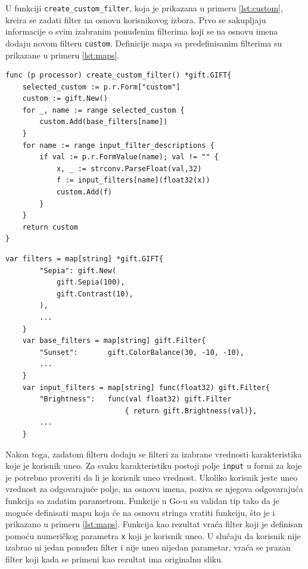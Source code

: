 \documentclass[12pt,oneside]{memoir}
\begin{document}
U funkciji  \texttt{create\_custom\_filter}, koja je prikazana u primeru \ref{lst:custom}, kreira se zadati filter na osnovu korisnikovog izbora. Prvo se sakupljaju informacije o svim izabranim ponuđenim filterima koji se na osnovu imena dodaju novom filteru  \texttt{custom}. Definicije mapa sa predefinisanim filterima su prikazane u primeru \ref{lst:maps}. 

\begin{center}
\begin{lstlisting}[caption=Funkcija za kreiranje zadatog filtera,label={lst:custom}, backgroundcolor=\color{background}]
func (p processor) create_custom_filter() *gift.GIFT{
	selected_custom := p.r.Form["custom"]
	custom := gift.New()
	for _, name := range selected_custom {
		custom.Add(base_filters[name])
	}
	for name := range input_filter_descriptions {
		if val := p.r.FormValue(name); val != "" {
			x, _ := strconv.ParseFloat(val,32)
			f := input_filters[name](float32(x))
			custom.Add(f)
		}
	}
	return custom
}
\end{lstlisting}
\end{center}

\begin{center}
\begin{lstlisting}[caption=Mape koje se koriste za definisanje različitih vrsta filtera,label={lst:maps},  backgroundcolor=\color{background}]
	var filters = map[string] *gift.GIFT{
		"Sepia": gift.New(
			gift.Sepia(100),
			gift.Contrast(10),
		),
		...
	}
	var base_filters = map[string] gift.Filter{
		"Sunset":      	gift.ColorBalance(30, -10, -10),
		...
	}
	var input_filters = map[string] func(float32) gift.Filter{
		"Brightness":	func(val float32) gift.Filter 
							{ return gift.Brightness(val)},
		...
	}
\end{lstlisting}
\end{center}

Nakon toga, zadatom filteru dodaju se filteri za izabrane vrednosti karakteristika koje je korisnik uneo. Za svaku karakteristiku postoji polje \texttt{input} u formi za koje je potrebno proveriti da li je korisnik uneo vrednost. Ukoliko korisnik jeste uneo vrednost za odgovarajuće polje, na osnovu imena, poziva se njegova odgovarajuća funkcija sa zadatim parametrom. Funkcije u Go-u su validan tip tako da je moguće definisati mapu koja će na osnovu stringa vratiti funkciju, što je i prikazano u primeru \ref{lst:maps}. Funkcija kao rezultat vraća filter koji je definisan pomoću numeričkog parametra  \texttt{x} koji je korisnik uneo. U slučaju da korisnik nije izabrao ni jedan ponuđen filter i nije uneo nijedan parametar, vraća se prazan filter koji kada se primeni kao rezultat ima originalnu sliku.
\end{document}
